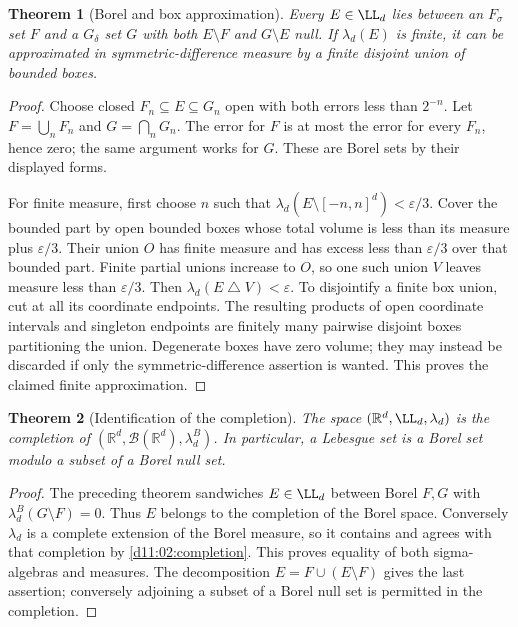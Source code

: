 \documentclass[11pt,oneside,openany]{book}
\newtheorem{theorem}{Theorem}[chapter]
\theoremstyle{definition}
\theoremstyle{remark}
\newcommand{\R}{\mathbb R}\newcommand{\C}{\mathbb C}
\newcommand{\eps}{\varepsilon}\newcommand{\ee}{\varepsilon}
\newcommand{\BB}{\mathcal B}\newcommand{\SSS}{\mathcal S}
\newcommand{\family}[1]{}
\begin{document}
\begin{theorem}[Borel and box approximation]
\family{D11.03.borel_approximation}\label{d11:03:borel-approximation}
Every $E\in\LL_d$ lies between an $F_\sigma$ set $F$ and a $G_\delta$ set
$G$ with both $E\setminus F$ and $G\setminus E$ null. If $\lambda_d(E)$
is finite, it can be approximated in symmetric-difference measure by a finite
disjoint union of bounded boxes.
\end{theorem}
\begin{proof}
Choose closed $F_n\subseteq E\subseteq G_n$ open with both errors less than
$2^{-n}$. Let $F=\bigcup_nF_n$ and $G=\bigcap_nG_n$. The error for $F$
is at most the error for every $F_n$, hence zero; the same argument works
for $G$. These are Borel sets by their displayed forms.

For finite measure, first choose $n$ such that
$\lambda_d(E\setminus[-n,n]^d)<\eps/3$. Cover the bounded part by open
bounded boxes whose total volume is less than its measure plus $\eps/3$.
Their union $O$ has finite measure and has excess less than $\eps/3$ over
that bounded part. Finite partial unions increase to $O$, so one such union
$V$ leaves measure less than $\eps/3$. Then
$\lambda_d(E\mathbin\triangle V)<\eps$. To disjointify a finite box union,
cut at all its coordinate endpoints. The resulting products of open
coordinate intervals and singleton endpoints are finitely many pairwise
disjoint boxes partitioning the union. Degenerate boxes have zero volume;
they may instead be discarded if only the symmetric-difference assertion
is wanted. This proves the claimed finite approximation.
\end{proof}

\begin{theorem}[Identification of the completion]
\family{D11.03.lebesgue_completion}\label{d11:03:lebesgue-completion}
The space $(\R^d,\LL_d,\lambda_d)$ is the completion of
$(\R^d,\BB(\R^d),\lambda_d^B)$. In particular, a Lebesgue set is a Borel
set modulo a subset of a Borel null set.
\end{theorem}
\begin{proof}
The preceding theorem sandwiches $E\in\LL_d$ between Borel $F,G$ with
$\lambda_d^B(G\setminus F)=0$. Thus $E$ belongs to the completion of the
Borel space. Conversely $\lambda_d$ is a complete extension of the Borel
measure, so it contains and agrees with that completion by
\cref{d11:02:completion}. This proves equality of both sigma-algebras and
measures. The decomposition $E=F\cup(E\setminus F)$ gives the last assertion;
conversely adjoining a subset of a Borel null set is permitted in the completion.
\end{proof}
\end{document}
